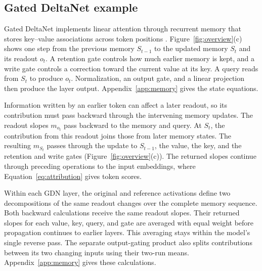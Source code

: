 \subsection{Gated DeltaNet example}
\label{sec:memory}
Gated DeltaNet implements linear attention through recurrent memory that stores key--value associations across token positions \citep{yang2024gated}. Figure~\ref{fig:overview}(c) shows one step from the previous memory $S_{t-1}$ to the updated memory $S_t$ and its readout $o_t$. A retention gate controls how much earlier memory is kept, and a write gate controls a correction toward the current value at its key. A query reads from $S_t$ to produce $o_t$. Normalization, an output gate, and a linear projection then produce the layer output. Appendix~\ref{app:memory} gives the state equations.

Information written by an earlier token can affect a later readout, so its contribution must pass backward through the intervening memory updates. The readout slopes $m_{o_t}$ pass backward to the memory and query. At $S_t$, the contribution from this readout joins those from later memory states. The resulting $m_{S_t}$ passes through the update to $S_{t-1}$, the value, the key, and the retention and write gates (Figure~\ref{fig:overview}(c)). The returned slopes continue through preceding operations to the input embeddings, where Equation~\ref{eq:attribution} gives token scores.

Within each GDN layer, the original and reference activations define two decompositions of the same readout changes over the complete memory sequence. Both backward calculations receive the same readout slopes. Their returned slopes for each value, key, query, and gate are averaged with equal weight before propagation continues to earlier layers. This averaging stays within the model's single reverse pass. The separate output-gating product also splits contributions between its two changing inputs using their two-run means. Appendix~\ref{app:memory} gives these calculations.
